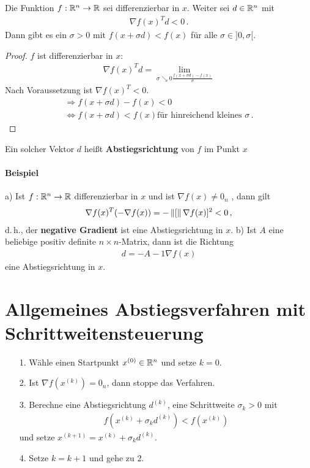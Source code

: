 \begin{Lemma}
Die Funktion $f : \mathbb R^n \rightarrow \mathbb R$ sei differenzierbar in $x$. Weiter sei $d \in \mathbb R^n$ mit
\begin{align*}
\nabla f(x)^Td < 0\,.
\end{align*}
Dann gibt es ein $\sigma > 0$ mit $f(x + \sigma d) < f (x)$ für alle $\sigma \in ]0, \sigma[$.
\end{Lemma}
\begin{proof}
$f$ ist differenzierbar in $x$:
\begin{align*}
\nabla f(x)^Td=\lim_{\sigma\searrow 0 \frac{f(x+\sigma d)-f(x)}{\sigma}}
\end{align*}
Nach Voraussetzung ist $\nabla f(x)^T<0$.
\begin{align*}
\Rightarrow f(x+\sigma d)-f(x)< 0\\
\Leftrightarrow f(x+\sigma d)<f(x) \text{für hinreichend kleines } \sigma \,.
\end{align*}
\end{proof}
Ein solcher Vektor $d$ heißt \textbf{Abstiegsrichtung} von $f$ im Punkt $x$

\paragraph{Beispiel}
a) Ist $f : \mathbb R^n \rightarrow \mathbb R$ differenzierbar in $x$ und ist $\nabla f(x) \neq 0_n$ , dann gilt
\begin{align*}
\nabla f(x)^T (-\nabla f(x)) = - \left\lVert[\right\rVert\nabla f(x)]^2< 0 \,,
\end{align*}
d.\,h., der \textbf{negative Gradient} ist eine Abstiegsrichtung in $x$.
b) Ist $A$ eine beliebige positiv definite $n \times n$-Matrix, dann ist die Richtung
\begin{align*}
d = -A-1 \nabla f(x)
\end{align*}
eine Abstiegsrichtung in $x$.

\section{Allgemeines Abstiegsverfahren mit Schrittweitensteuerung}
\begin{itemize}
\item[1.] Wähle einen Startpunkt $x^{(0)} \in \mathbb R^n$ und setze $k = 0$.
\item[2.] Ist $\nabla f(x^{(k)}) = 0_n$, dann stoppe das Verfahren.
\item[3.] Berechne eine Abstiegsrichtung $d^{(k)}$, eine Schrittweite $\sigma_k > 0$ mit
\begin{align*}
f (x^{(k)} + \sigma_k d^{(k)}) < f (x^{(k)})
\end{align*}
und setze $x^{(k+1)} = x^{(k)} + \sigma_k d^{(k)}$.
\item[4.] Setze $k = k + 1$ und gehe zu 2.
\end{itemize}

